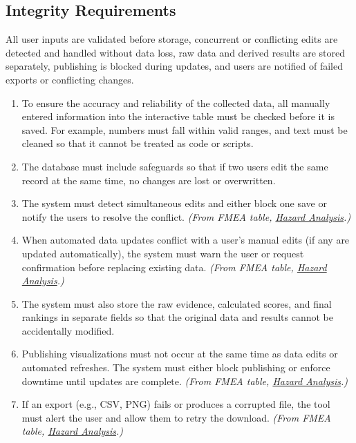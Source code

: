 \documentclass[12pt]{article}
\begin{document}
\subsection{Integrity Requirements}
All user inputs are validated before storage, concurrent or conflicting edits are detected and handled without data loss, raw data and derived results are stored separately, publishing is blocked during updates, and users are notified of failed exports or conflicting changes.

\begin{enumerate}[label=SR-INT\arabic*]
\item To ensure the accuracy and reliability of the collected data, all manually entered information into the interactive table must be checked before it is saved. For example, numbers must fall within valid ranges, and text must be cleaned so that it cannot be treated as code or scripts.
\item The database must include safeguards so that if two users edit the same record at the same time, no changes are lost or overwritten.
\item The system must detect simultaneous edits and either block one save or notify the users to resolve the conflict. \textit{(From FMEA table, \href{https://github.com/thaafei/DomainX/blob/main/docs/HazardAnalysis/HazardAnalysis.pdf}{Hazard Analysis}.)}
\item When automated data updates conflict with a user’s manual edits (if any are updated automatically), the system must warn the user or request confirmation before replacing existing data. \textit{(From FMEA table, \href{https://github.com/thaafei/DomainX/blob/main/docs/HazardAnalysis/HazardAnalysis.pdf}{Hazard Analysis}.)}
\item The system must also store the raw evidence, calculated scores, and final rankings in separate fields so that the original data and results cannot be accidentally modified.
\item Publishing visualizations must not occur at the same time as data edits or automated refreshes. The system must either block publishing or enforce downtime until updates are complete. \textit{(From FMEA table, \href{https://github.com/thaafei/DomainX/blob/main/docs/HazardAnalysis/HazardAnalysis.pdf}{Hazard Analysis}.)}
\item If an export (e.g., CSV, PNG) fails or produces a corrupted file, the tool must alert the user and allow them to retry the download. \textit{(From FMEA table, \href{https://github.com/thaafei/DomainX/blob/main/docs/HazardAnalysis/HazardAnalysis.pdf}{Hazard Analysis}.)}
\end{enumerate}
\end{document}
